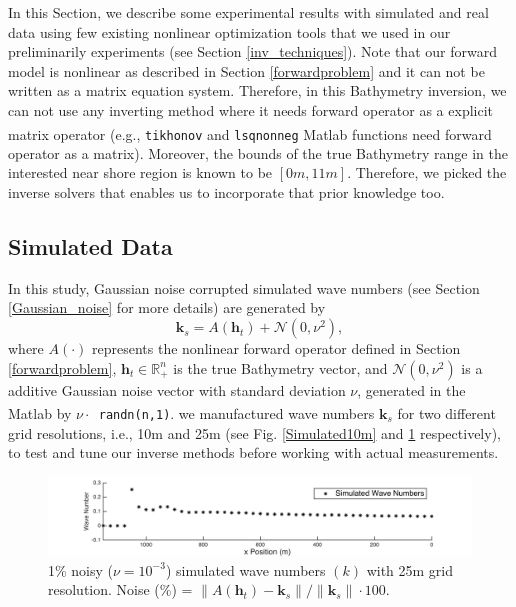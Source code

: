 
In this Section, we describe some experimental results with simulated and real data using few existing nonlinear optimization tools that we used in our preliminarily experiments (see Section \ref{inv_techniques}). Note that our forward model is nonlinear as described in Section \ref{forwardproblem} and it can not be written as a matrix equation system. Therefore, in this Bathymetry inversion, we can not use any inverting method where it needs forward operator as a explicit matrix operator (e.g., \verb|tikhonov| and  \verb|lsqnonneg|     
 Matlab\textsuperscript{\textregistered} functions need forward operator as a matrix). Moreover, the bounds of the true Bathymetry range in the interested near shore region is known to be $[0m, 11m]$. Therefore, we picked the inverse solvers that enables us to incorporate that prior knowledge too. 

\subsection{Simulated Data}
In this study, Gaussian noise corrupted simulated wave numbers (see Section \ref{Gaussian_noise} for more details) are generated by 
\begin{equation}
\mathbf{k}_s = A(\mathbf{h}_t) + \mathcal{N}(0, \nu^2),
\end{equation}
where $A(\cdot)$ represents the nonlinear forward operator defined in Section \ref{forwardproblem}, $\mathbf{h}_t \in \mathbb{R}_+^n$ is the true Bathymetry vector, and $\mathcal{N}(0, \nu^2)$ is a additive Gaussian noise vector with standard deviation $\nu$, generated in the Matlab\textsuperscript{\textregistered} by $\nu \cdot $\verb| randn(n,1)|. we manufactured wave numbers $\mathbf{k}_s$ for two different grid resolutions, i.e., 10m and 25m (see Fig. \ref{Simulated10m} and \ref{Simulated25m} respectively), to test and tune our inverse methods before working with actual measurements. 



\begin{figure}[H]
\center
\includegraphics[scale=0.6]{img/simulated_data_k25m.png} 
\caption{1\% noisy ($\nu = 10^{-3}$) simulated wave numbers $(k)$ with 25m grid resolution. Noise (\%) = $\|A(\mathbf{h}_t) -  \mathbf{k}_s\| / \|  \mathbf{k}_s \| \cdot 100$.}
\label{Simulated25m}
\end{figure}

